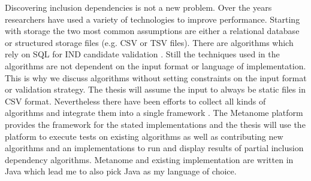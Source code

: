 Discovering inclusion dependencies is not a new problem. Over the years researchers have used a variety of technologies to improve performance. Starting with storage the two most common assumptions are either a relational database or structured storage files (e.g. CSV or TSV files). There are algorithms which rely on SQL for IND candidate validation
. Still the techniques used in the algorithms are not dependent on the input format or language of implementation. This is why we discuss algorithms without setting constraints on the input format or validation strategy. The thesis will assume the input to always be static files in CSV format. Nevertheless there have been efforts to collect all kinds of algorithms and integrate them into a single framework
. The Metanome platform \cite{Papenbrock:2015:DPM:2824032.2824086} provides the framework for the stated implementations and the thesis will use the platform to execute tests on existing algorithms as well as contributing new algorithms and an implementations to run and display results of partial inclusion dependency algorithms. Metanome and existing implementation are written in Java which lead me to also pick Java as my language of choice.